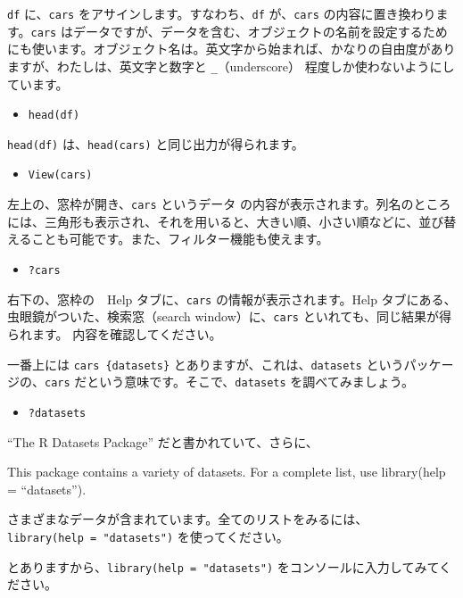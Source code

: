 \documentclass[
]{bxjsbook}
\providecommand{\tightlist}{%
  \setlength{\itemsep}{0pt}\setlength{\parskip}{0pt}}
\theoremstyle{definition}
\theoremstyle{definition}
\theoremstyle{definition}
\theoremstyle{definition}
\theoremstyle{remark}
\begin{document}
\texttt{df} に、\texttt{cars} をアサインします。すなわち、\texttt{df} が、\texttt{cars} の内容に置き換わります。\texttt{cars} はデータですが、データを含む、オブジェクトの名前を設定するためにも使います。オブジェクト名は。英文字から始まれば、かなりの自由度がありますが、わたしは、英文字と数字と \texttt{\_}（underscore） 程度しか使わないようにしています。

\begin{itemize}
\tightlist
\item
  \texttt{head(df)}
\end{itemize}

\texttt{head(df)} は、\texttt{head(cars)} と同じ出力が得られます。

\begin{itemize}
\tightlist
\item
  \texttt{View(cars)}
\end{itemize}

左上の、窓枠が開き、\texttt{cars} というデータ の内容が表示されます。列名のところには、三角形も表示され、それを用いると、大きい順、小さい順などに、並び替えることも可能です。また、フィルター機能も使えます。

\begin{itemize}
\tightlist
\item
  \texttt{?cars}
\end{itemize}

右下の、窓枠の　Help タブに、\texttt{cars} の情報が表示されます。Help タブにある、虫眼鏡がついた、検索窓（search window）に、\texttt{cars} といれても、同じ結果が得られます。
内容を確認してください。

一番上には \texttt{cars\ \{datasets\}} とありますが、これは、\texttt{datasets} というパッケージの、\texttt{cars} だという意味です。そこで、\texttt{datasets} を調べてみましょう。

\begin{itemize}
\tightlist
\item
  \texttt{?datasets}
\end{itemize}

``The R Datasets Package'' だと書かれていて、さらに、

This package contains a variety of datasets. For a complete list, use library(help = ``datasets'').

さまざまなデータが含まれています。全てのリストをみるには、\texttt{library(help\ =\ "datasets")} を使ってください。

とありますから、\texttt{library(help\ =\ "datasets")} をコンソールに入力してみてください。
\end{document}
